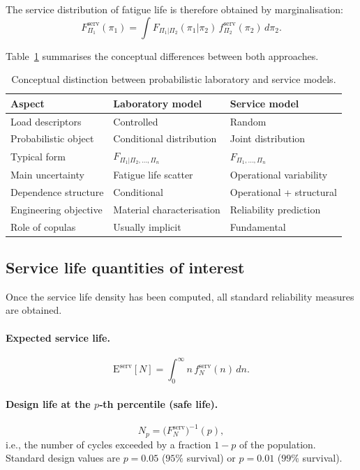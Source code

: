 The service distribution of fatigue life is therefore obtained by marginalisation:
\begin{equation}
F_{\Pi_1}^{\mathrm{serv}}(\pi_1)
=
\int
F_{\Pi_1|\Pi_2}(\pi_1|\pi_2)
\,f_{\Pi_2}^{\mathrm{serv}}(\pi_2)
\,d\pi_2.
\label{eq:service}
\end{equation}

Table~\ref{tab:labservice} summarises the conceptual differences between both approaches.

\begin{table}[htpb]
\centering
\caption{Conceptual distinction between probabilistic laboratory and service models.}
\label{tab:labservice}
\renewcommand{\arraystretch}{1.45}
\begin{tabular}{lll}
\hline
Aspect & Laboratory model & Service model \\
\hline
Load descriptors & Controlled & Random \\
Probabilistic object & Conditional distribution & Joint distribution \\
Typical form & $F_{\Pi_1|\Pi_2,\ldots,\Pi_n}$ & $F_{\Pi_1,\ldots,\Pi_n}$ \\
Main uncertainty & Fatigue life scatter & Operational variability \\
Dependence structure & Conditional & Operational + structural \\
Engineering objective & Material characterisation & Reliability prediction \\
Role of copulas & Usually implicit & Fundamental \\
\hline
\end{tabular}
\end{table}

\subsection{Service life quantities of interest}

Once the service life density has been computed, all standard reliability measures are obtained.

\paragraph{Expected service life.}
\begin{equation}
\mathrm{E}^{\mathrm{serv}}[N]
= \int_0^\infty n\,f_N^{\mathrm{serv}}(n)\,dn.
\label{eq:mean}
\end{equation}

\paragraph{Design life at the $p$‑th percentile (safe life).}
\begin{equation}
N_p = \bigl(F_N^{\mathrm{serv}}\bigr)^{-1}(p),
\label{eq:quantile}
\end{equation}
i.e., the number of cycles exceeded by a fraction $1-p$ of the population. Standard design values are $p=0.05$ ($95\%$ survival) or $p=0.01$ ($99\%$ survival).

